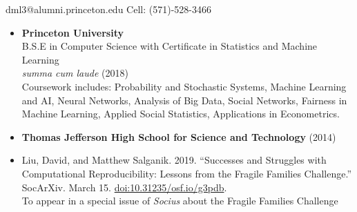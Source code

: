 \documentclass[margin]{res}
\begin{document}
 


\begin{resume} 
\hspace*{-\hoffset}dml3@alumni.princeton.edu \hfill Cell: (571)-528-3466 \\

 

\begin{itemize}
\section{Education} 

\item
\textbf{Princeton University\\}
B.S.E in Computer Science with Certificate in Statistics and Machine Learning\\
\emph{summa cum laude} (2018)\\ 
Coursework includes: Probability and Stochastic Systems, Machine Learning and AI, Neural Networks, Analysis of Big Data, Social Networks, Fairness in Machine Learning, Applied Social Statistics, Applications in Econometrics.
\item
\textbf{Thomas Jefferson High School for Science and Technology} (2014)
\end{itemize}

\begin{itemize} \itemsep -1pt  %
\section{Preprints}
\item
Liu, David, and Matthew Salganik. 2019. “Successes and Struggles with Computational Reproducibility: Lessons from the Fragile Families Challenge.” SocArXiv. March 15. \url{doi:10.31235/osf.io/g3pdb}. \\
To appear in a special issue of \emph{Socius} about the Fragile Families Challenge


\end{itemize}
\end{resume}
\end{document}
